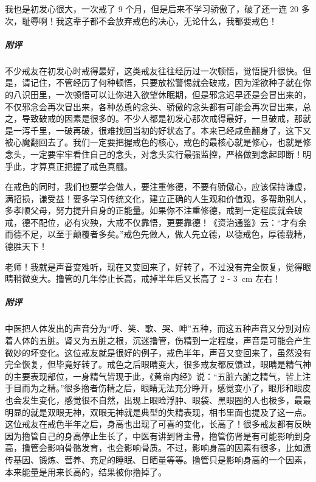\begin{case}
    我也是初发心很大，一次戒了 9 个月，但是后来不学习骄傲了，破了还一连 20 多次，耻辱啊！我这辈子都不会放弃戒色的决心，无论什么，我都要戒色！
    \subparagraph{附评} 不少戒友在初发心时戒得最好，这类戒友往往经历过一次顿悟，觉悟提升很快。但是，请记住，不管经历了何种顿悟，只要放松警惕就会破戒，因为淫欲种子就在你的八识田里，一次顿悟可以让你进入欲望休眠期，但是邪念迟早还是会冒出来的，不仅邪念会再次冒出来，各种怂恿的念头、骄傲的念头都有可能会再次冒出来，总之，导致破戒的因素是很多的。不少人都是初发心那次戒得最好，一旦破戒，那就是一泻千里，一破再破，很难找回当初的好状态了。本来已经咸鱼翻身了，这下又被心魔翻回去了。我们一定要把握戒色的核心，戒色的最核心就是修心，也就是修念头，一定要牢牢看住自己的念头，对念头实行最强监控，严格做到念起即断！明乎此，才算真正把握了戒色真髓。

    在戒色的同时，我们也要学会做人，要注重修德，不要有骄傲心，应该保持谦虚，满招损，谦受益！要多学习传统文化，建立正确的人生观和价值观，多帮助别人，多孝顺父母，努力提升自身的正能量。如果你不注重修德，戒到一定程度就会破戒，德不配位，必有灾殃，大戒不仅靠悟，更要靠德！《资治通鉴》云：“才有余而德不足，以至于颠覆者多矣。”戒色先做人，做人先立德，以德戒色，厚德载精，德胜天下！
\end{case}

\begin{case}
    老师！我就是声音变难听，现在又变回来了，好转了，不过没有完全恢复，觉得眼睛稍微变大。撸管的几年停止长高，戒掉半年后又长高了 2 - \SI{3}{\centi\metre} 左右！
    \subparagraph{附评} 中医把人体发出的声音分为“呼、笑、歌、哭、呻”五种，而这五种声音又分别对应着人体的五脏。肾又为五脏之根，沉迷撸管，伤精到一定程度，声音是可能会产生微妙的坏变化。这位戒友就是很好的例子，戒色半年，声音又变回来了，虽然没有完全恢复，但毕竟好转了。戒色之后眼睛变大，很多戒友都反馈过，眼睛是精气神的主要表现部位，一身精气皆现于此，《黄帝内经》说：“五脏六腑之精气，皆上注于目而为之精。”很多撸者伤精之后，眼睛无法充分睁开，感觉变小了，眼形和眼皮也会发生变化，感觉很不自然，出现上眼睑浮肿、眼袋、黑眼圈的人也极多，最最明显的就是双眼无神，双眼无神就是典型的失精表现，相书里面也提及了这一点。这位戒友在戒色半年之后，身高也出现了可喜的变化，长高了！很多戒友都有反映因为撸管自己的身高停止生长了，中医有讲到肾主骨，撸管伤肾是有可能影响到身高，撸管会影响骨骼发育，也会影响骨质。不过，影响身高的因素有很多，比如遗传基因、锻炼、营养、充足的睡眠、日晒量等等。撸管只是影响身高的一个因素，本来能量是用来长高的，结果被你撸掉了。
\end{case}

